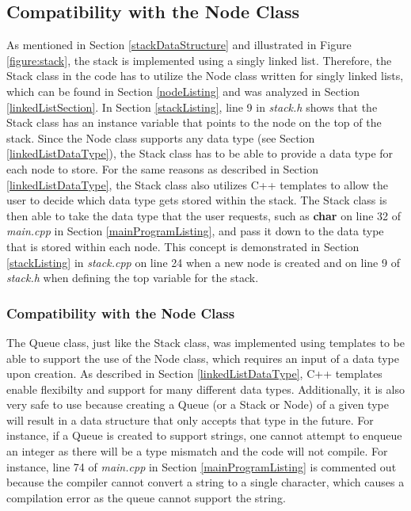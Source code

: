 \documentclass[letterpaper, 10pt,DIV=13]{scrartcl}
\numberwithin{equation}{section} %
\numberwithin{figure}{section} %
\numberwithin{table}{section} %
\begin{document}
\subsection{Compatibility with the Node Class}
As mentioned in Section \ref{stackDataStructure} and illustrated in Figure \ref{figure:stack}, the stack is implemented using a singly linked list. Therefore, the Stack class in the code has to utilize the Node class written for singly linked lists, which can be found in Section \ref{nodeListing} and was analyzed in Section \ref{linkedListSection}. In Section \ref{stackListing}, line 9 in \textit{stack.h} shows that the Stack class has an instance variable that points to the node on the top of the stack. Since the Node class supports any data type (see Section \ref{linkedListDataType}), the Stack class has to be able to provide a data type for each node to store. For the same reasons as described in Section \ref{linkedListDataType}, the Stack class also utilizes C++ templates to allow the user to decide which data type gets stored within the stack. The Stack class is then able to take the data type that the user requests, such as \textbf{char} on line 32 of \textit{main.cpp} in Section \ref{mainProgramListing}, and pass it down to the data type that is stored within each node. This concept is demonstrated in Section \ref{stackListing} in \textit{stack.cpp} on line 24 when a new node is created and on line 9 of \textit{stack.h} when defining the top variable for the stack.
\subsubsection{Compatibility with the Node Class}\label{queueNodes}
The Queue class, just like the Stack class, was implemented using templates to be able to support the use of the Node class, which requires an input of a data type upon creation. As described in Section \ref{linkedListDataType}, C++ templates enable flexibilty and support for many different data types. Additionally, it is also very safe to use because creating a Queue (or a Stack or Node) of a given type will result in a data structure that only accepts that type in the future. For instance, if a Queue is created to support strings, one cannot attempt to enqueue an integer as there will be a type mismatch and the code will not compile. For instance, line 74 of \textit{main.cpp} in Section \ref{mainProgramListing} is commented out because the compiler cannot convert a string to a single character, which causes a compilation error as the queue cannot support the string.
\end{document}
